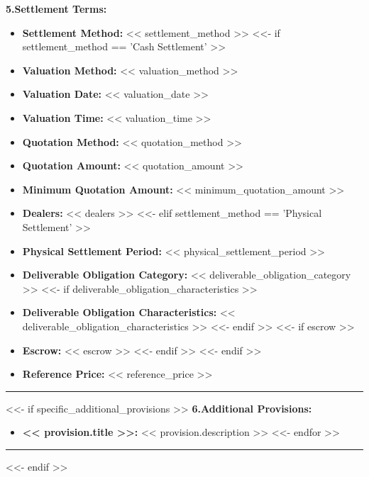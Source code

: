 \documentclass[11pt, a4paper]{article}
\begin{document}
\noindent \textbf{5.\quad Settlement Terms:}
\begin{itemize}[leftmargin=2cm, label={}, itemsep=3pt]
    \item \textbf{Settlement Method:} << settlement_method >>
<<- if settlement_method == 'Cash Settlement' >>
    \item \textbf{Valuation Method:} << valuation_method >>
    \item \textbf{Valuation Date:} << valuation_date >>
    \item \textbf{Valuation Time:} << valuation_time >>
    \item \textbf{Quotation Method:} << quotation_method >>
    \item \textbf{Quotation Amount:} << quotation_amount >>
    \item \textbf{Minimum Quotation Amount:} << minimum_quotation_amount >>
    \item \textbf{Dealers:} << dealers >>
<<- elif settlement_method == 'Physical Settlement' >>
    \item \textbf{Physical Settlement Period:} << physical_settlement_period >>
    \item \textbf{Deliverable Obligation Category:} << deliverable_obligation_category >>
<<- if deliverable_obligation_characteristics >>
    \item \textbf{Deliverable Obligation Characteristics:} << deliverable_obligation_characteristics >>
<<- endif >>
<<- if escrow >>
    \item \textbf{Escrow:} << escrow >>
<<- endif >>
<<- endif >>
    \item \textbf{Reference Price:} << reference_price >>
\end{itemize}

\vspace{0.5cm}
\hrule
\vspace{0.5cm}


<<- if specific_additional_provisions >>
\noindent \textbf{6.\quad Additional Provisions:}
\begin{itemize}[leftmargin=2cm, label={}, itemsep=3pt]
<<- for provision in specific_additional_provisions >>
    \item \textbf{<< provision.title >>:} << provision.description >>
<<- endfor >>
\end{itemize}
\vspace{0.3cm}
\hrule
\vspace{0.5cm}
<<- endif >>
\end{document}
